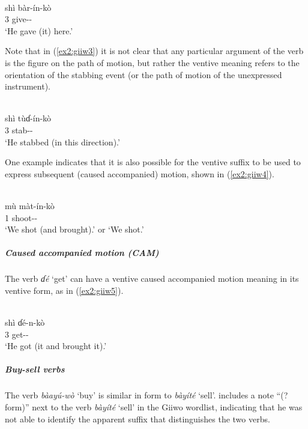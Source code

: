 \ex\label{ex2:giiw2}
 \\
\gll  shì	bàr-ín-kò \\
3	give-- \\
\glt `He gave (it) here.'
\z 

\newpage
Note that in (\ref{ex2:giiw3}) it is not clear that any particular argument of the verb is the figure on the path of motion, but rather the ventive meaning refers to the orientation of the stabbing event (or the path of motion of the unexpressed instrument). 

\ea\label{ex2:giiw3}
 \\
\gll  shì	tùɗ-ín-kò \\
3	stab-- \\
\glt `He stabbed (in this direction).'
\z 

One example indicates that it is also possible for the ventive suffix to be used to express subsequent (caused accompanied) motion, shown in (\ref{ex2:giiw4}).

\ea\label{ex2:giiw4}
 \\
\gll  mù	màt-ín-kò \\
1	shoot-- \\
\glt `We shot (and brought).' or `We shot.'
\z 

\subparagraph{Caused accompanied motion (CAM)}



The verb \textit{ɗé} `get' can have a ventive caused accompanied motion meaning in its ventive form, as in (\ref{ex2:giiw5}). 

\ea\label{ex2:giiw5}
 \\
\gll  shì	ɗé-n-kò \\
3	get-- \\
\glt `He got (it and brought it).'
\z 

\subparagraph{Buy-sell verbs}



The verb \textit{bàayú-wò} ‘buy’ is similar in form to \textit{bàyíté} ‘sell’. \citet[52]{schuhBoleTangaleLanguagesBauchi1978} includes a note ``(? form)'' next to the verb \textit{bàyíté} ‘sell’ in the Giiwo wordlist, indicating that he was not able to identify the apparent suffix that distinguishes the two verbs. 

